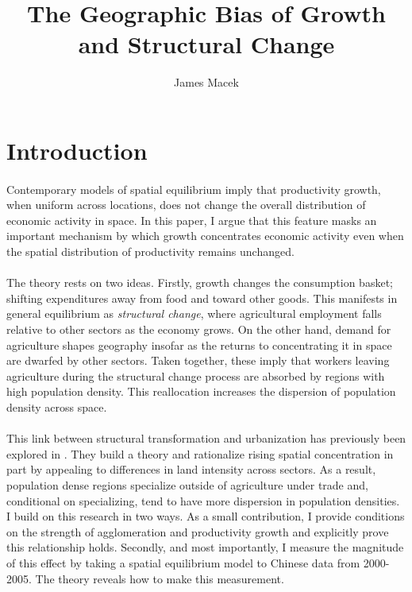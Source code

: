 \documentclass[]{article}
\title{The Geographic Bias of Growth and Structural Change}
\author{James Macek}
\theoremstyle{plain}
\begin{document}
\maketitle

\begin{abstract}


\end{abstract}

\newpage
\section{Introduction}

\paragraph*{}
Contemporary models of spatial equilibrium imply that productivity growth, when uniform across locations, does not change the overall distribution of economic activity in space. In this paper, I argue that this feature masks an important mechanism by which growth concentrates economic activity even when the spatial distribution of productivity remains unchanged. 
\paragraph*{}
The theory rests on two ideas. Firstly, growth changes the consumption basket; shifting expenditures away from food and toward other goods. This manifests in general equilibrium as \textit{structural change}, where agricultural employment falls relative to other sectors as the economy grows. On the other hand, demand for agriculture shapes geography insofar as the returns to concentrating it in space are dwarfed by other sectors. Taken together, these imply that workers leaving agriculture during the structural change process are absorbed by regions with high population density. This reallocation increases the dispersion of population density across space.
\paragraph*{}
This link between structural transformation and urbanization has previously been explored in \citet{urbstruct}. They build a theory and rationalize rising spatial concentration in part by appealing to differences in land intensity across sectors. As a result, population dense regions specialize outside of agriculture under trade and, conditional on specializing, tend to have more dispersion in population densities. I build on this research in two ways. As a small contribution, I  provide conditions on the strength of agglomeration and productivity growth and explicitly prove this relationship holds. Secondly, and most importantly, I measure the magnitude of this effect by taking a spatial equilibrium model to Chinese data from 2000-2005. The theory reveals how to make this measurement. 
\end{document}
